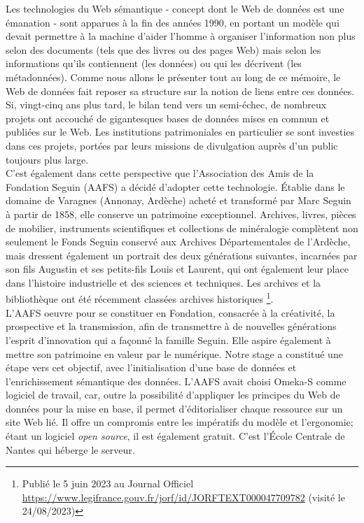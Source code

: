 \documentclass[a4paper,12pt,twoside]{book}
\begin{document}
Les technologies du Web sémantique - concept dont le Web de données est une émanation - sont apparues à la fin des années 1990, en portant un modèle qui devait permettre à la machine d'aider l'homme à organiser l'information non plus selon des documents (tels que des livres ou des pages Web) mais selon les informations qu'ils contiennent (les données) ou qui les décrivent (les métadonnées). Comme nous allons le présenter tout au long de ce mémoire, le Web de données fait reposer sa structure sur la notion de liens entre ces données. Si, vingt-cinq ans plus tard, le bilan tend vers un semi-échec, de nombreux projets ont accouché de gigantesques bases de données mises en commun et publiées sur le Web. Les institutions patrimoniales en particulier se sont investies dans ces projets, portées par leurs missions de divulgation auprès d'un public toujours plus large.\\

C'est également dans cette perspective que l'Association des Amis de la Fondation Seguin (AAFS) a décidé d'adopter cette technologie. Établie dans le domaine de Varagnes (Annonay, Ardèche) acheté et transformé par Marc Seguin à partir de 1858, elle conserve un patrimoine exceptionnel. Archives, livres, pièces de mobilier, instruments scientifiques et collections de minéralogie complètent non seulement le Fonds Seguin conservé aux Archives Départementales de l'Ardèche, mais dressent également un portrait des deux générations suivantes, incarnées par son fils Augustin et ses petits-fils Louis et Laurent, qui ont également leur place dans l'histoire industrielle et des sciences et techniques. Les archives et la bibliothèque ont été récemment classées \og archives historiques \fg\footnote{Publié le 5 juin 2023 au Journal Officiel \url{https://www.legifrance.gouv.fr/jorf/id/JORFTEXT000047709782} (visité le 24/08/2023)}.\\

L'AAFS oeuvre pour se constituer en Fondation, consacrée à la créativité, la prospective et la transmission, afin de transmettre à de nouvelles générations l'esprit d'innovation qui a façonné la famille Seguin. Elle aspire également à mettre son patrimoine en valeur par le numérique. Notre stage a constitué une étape vers cet objectif, avec l'initialisation d'une base de données et l'enrichissement sémantique des données. L'AAFS avait choisi Omeka-S comme logiciel de travail, car, outre la possibilité d'appliquer les principes du Web de données pour la mise en base, il permet d'éditorialiser chaque ressource sur un site Web lié. Il offre un compromis entre les impératifs du modèle et l'ergonomie; étant un logiciel \textit{open source}, il est également gratuit. C'est l'École Centrale de Nantes qui héberge le serveur.\\
\end{document}
